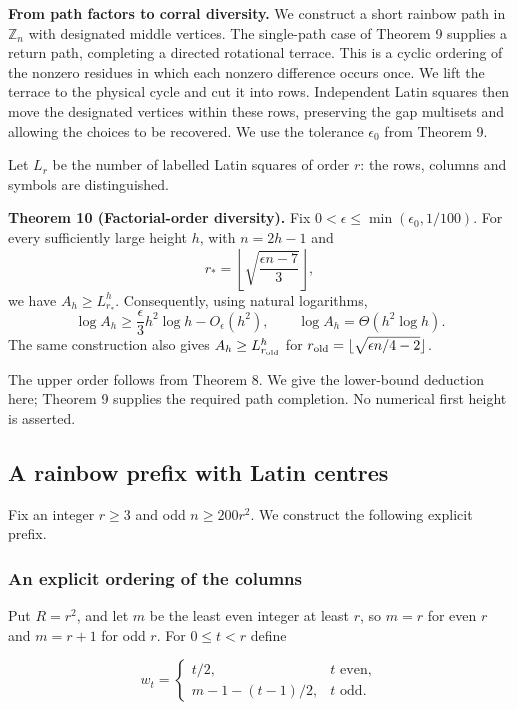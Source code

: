 \documentclass[11pt,a4paper]{article}
\newcommand{\statementstart}{\par\addvspace{6pt plus 1pt minus 1pt}\noindent}
\begin{document}
\textbf{From path factors to corral diversity.} We construct a short rainbow path in \(\mathbb Z_n\) with designated middle vertices. The single-path case of Theorem 9 supplies a return path, completing a directed rotational terrace. This is a cyclic ordering of the nonzero residues in which each nonzero difference occurs once. We lift the terrace to the physical cycle and cut it into rows. Independent Latin squares then move the designated vertices within these rows, preserving the gap multisets and allowing the choices to be recovered. We use the tolerance \(\epsilon_0\) from Theorem 9.

Let \(L_r\) be the number of labelled Latin squares of order \(r\): the rows, columns and symbols are distinguished.

\statementstart\textbf{Theorem 10 (Factorial-order diversity).} Fix \(0<\epsilon\leq\min(\epsilon_0,1/100)\). For every sufficiently large height \(h\), with \(n=2h-1\) and \[
 r_*=\left\lfloor\sqrt{\frac{\epsilon n-7}{3}}\right\rfloor,
\] we have \(A_h\geq L_{r_*}^h\). Consequently, using natural logarithms, \[
 \log A_h\geq\frac{\epsilon}{3}h^2\log h-O_\epsilon(h^2),
 \qquad \log A_h=\Theta(h^2\log h).
\] The same construction also gives \(A_h\geq L_{r_{\rm old}}^h\) for \(r_{\rm old}=\lfloor\sqrt{\epsilon n/4-2}\rfloor\).

The upper order follows from Theorem 8. We give the lower-bound deduction here; Theorem 9 supplies the required path completion. No numerical first height is asserted.

\hypertarget{a-rainbow-prefix-with-latin-centres}{%
\subsection{A rainbow prefix with Latin centres}\label{a-rainbow-prefix-with-latin-centres}}

Fix an integer \(r\geq3\) and odd \(n\geq200r^2\). We construct the following explicit prefix.

\hypertarget{an-explicit-ordering-of-the-columns}{%
\subsubsection{An explicit ordering of the columns}\label{an-explicit-ordering-of-the-columns}}

Put \(R=r^2\), and let \(m\) be the least even integer at least \(r\), so \(m=r\) for even \(r\) and \(m=r+1\) for odd \(r\). For \(0\leq t<r\) define

\[
w_t=\begin{cases}
t/2,&t\text{ even},\\
m-1-(t-1)/2,&t\text{ odd}.
\end{cases}
\]
\end{document}
